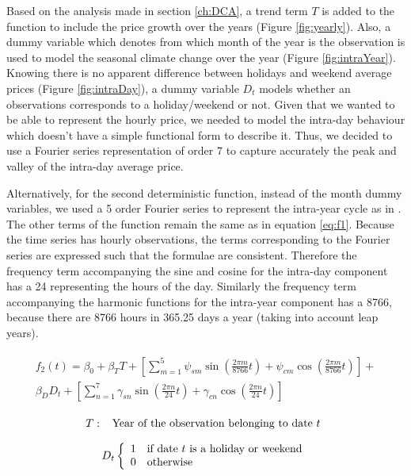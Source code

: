 \documentclass[3p]{elsarticle}
\begin{document}
Based on the analysis made in section \ref{ch:DCA}, a trend term $T$ is added to the function to include the price growth over the years (Figure \ref{fig:yearly}). Also, a dummy variable which denotes from which month of the year is the observation is used to model the seasonal climate change over the year (Figure \ref{fig:intraYear}). Knowing there is no apparent difference between holidays and weekend average prices (Figure \ref{fig:intraDay}), a dummy variable $D_t$ models whether an observations corresponds to a holiday/weekend or not. Given that we wanted to be able to represent the hourly price, we needed to model the intra-day behaviour which doesn't have a simple functional form to describe it. Thus, we decided to use a Fourier series representation of order 7 to capture accurately the peak and valley of the intra-day average price.

Alternatively, for the second deterministic function, instead of the month dummy variables, we used a 5 order Fourier series to represent the intra-year cycle as in \citep{Escribano2011}. The other terms of the function remain the same as in equation  \ref{eq:f1}. Because the time series has hourly observations, the terms corresponding to the Fourier series are expressed such that the formulae are consistent. Therefore the frequency term accompanying the sine and cosine for the intra-day component has a 24 representing the hours of the day. Similarly the frequency term accompanying the harmonic functions for the intra-year component has a 8766, because there are 8766 hours in 365.25 days a year (taking into account leap years).

\begin{align}
\label{eq:f2}
\begin{split}
f_2(t)=\beta_0+\beta_T T+\left [ \sum_{m=1}^{5} \psi_{sm}\sin\left ( \frac{2\pi m}{8766}t \right )+\psi_{cm}\cos\left ( \frac{2\pi m}{8766}t \right )\right ]+\\
\beta_DD_t+\left [ \sum_{n=1}^{7} \gamma_{sn}\sin\left ( \frac{2\pi n}{24}t \right )+\gamma_{cn}\cos\left ( \frac{2\pi n}{24}t \right )\right ]
\end{split}
\end{align}

\[T:\
\begin{array}{ll}
 \textup{Year of the observation belonging to date } t 
\end{array}\] 

\[D_t\left\{
\begin{array}{ll}
      1 & \textup{if date } t \textup{ is a holiday or weekend} \\
      0 & \textup{otherwise} \\
\end{array} 
\right. \]
\end{document}
